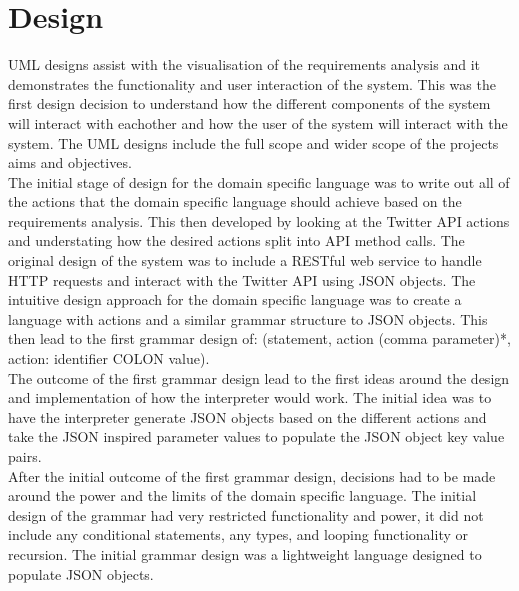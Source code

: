 \chapter{Design}
UML designs assist with the visualisation of the requirements analysis and it demonstrates the functionality and user interaction of the system. This was the first design decision to understand how the different components of the system will interact with eachother and how the user of the system will interact with the system. The UML designs include the full scope and wider scope of the projects aims and objectives. \\

The initial stage of design for the domain specific language was to write out all of the actions that the domain specific language should achieve based on the requirements analysis. This then developed by looking at the Twitter API actions and understating how the desired actions split into API method calls. The original design of the system was to include a RESTful web service to handle HTTP requests and interact with the Twitter API using JSON objects. The intuitive design approach for the domain specific language was to create a language with actions and a similar grammar structure to JSON objects. This then lead to the first grammar design of: (statement, action (comma parameter)*, action: identifier COLON value). \\

The outcome of the first grammar design lead to the first ideas around the design and implementation of how the interpreter would work. The initial idea was to have the interpreter generate JSON objects based on the different actions and take the JSON inspired parameter values to populate the JSON object key value pairs. \\

After the initial outcome of the first grammar design, decisions had to be made around the power and the limits of the domain specific language. The initial design of the grammar had very restricted functionality and power, it did not include any conditional statements, any types, and looping functionality or recursion. The initial grammar design was a lightweight language designed to populate JSON objects. \\

